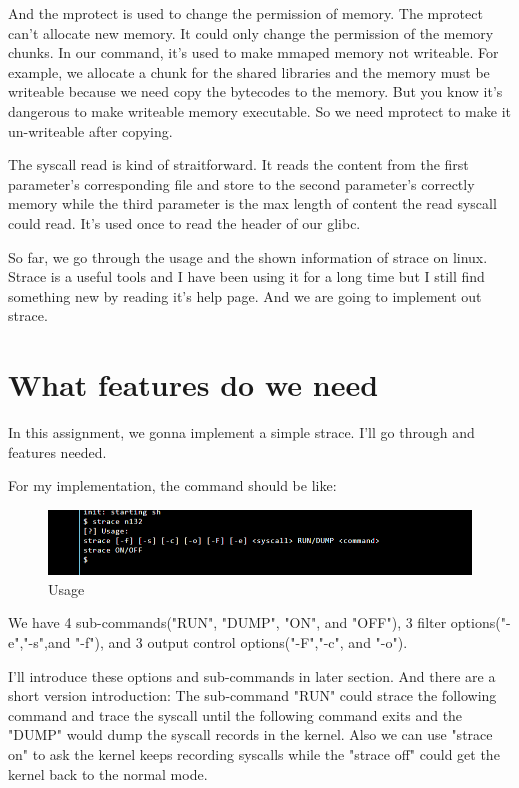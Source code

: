 \documentclass[11pt,oneside,a4paper]{article}
\begin{document}
And the mprotect is used  to change the permission of memory. The mprotect can't 
allocate new memory. It could only change the permission of the memory chunks. 
In our command, it's used to make mmaped memory not writeable. For example, we 
allocate a chunk for the shared libraries and the memory must be writeable because
we need copy the bytecodes to the memory. But you know it's dangerous to make writeable
memory executable. So we need mprotect to make it un-writeable after copying.

The syscall read is kind of straitforward. It reads the content from the first parameter's
corresponding file and store to the second parameter's correctly memory while the third
parameter is the max length of content the read syscall could read. It's used once to 
read the header of our glibc.

So far, we go through the usage and the shown information of strace on linux.
Strace is a useful tools and I have been using it for a long time but I still 
find something new by reading it's help page. And we are going to implement 
out strace.

\section{What features do we need}

In this assignment, we gonna implement a simple strace. I'll go through and features 
needed. 

For my implementation, the command should be like:

\begin{figure}[H]
    \includegraphics[width=4.75in]{1-4.png}
    \centering
    \caption{Usage}
\end{figure}

We have 4 sub-commands("RUN", "DUMP", "ON", and "OFF"), 3 filter options("-e","-s",and "-f"),
and 3 output control options("-F","-c", and "-o").

I'll introduce these options and sub-commands in later section. And there are a short 
version introduction: The sub-command "RUN" could strace the following command and 
trace the syscall until the following command exits and the "DUMP" would dump the 
syscall records in the kernel. Also we can use "strace on" to ask the kernel keeps
recording syscalls while the "strace off" could get the kernel back to the normal mode.
\end{document}
